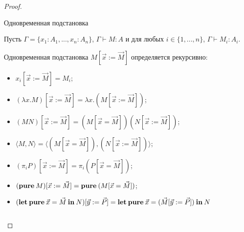 \begin{proof}
\begin{defin}
\begin{itemize}
\begin{small}
  \begin{prooftree}
  \end{prooftree}
\end{small}
\end{itemize}
\end{defin}

\begin{defin} Одновременная подстановка

Пусть $\Gamma = \{ x_1 : A_1, ..., x_n : A_n \}$, $\Gamma \vdash M : A$ и для любых $i \in \{ 1,..., n \}$,
$\Gamma \vdash M_i : A_i$.

 Одновременная подстановка $M [ \vec{x} := \vec{M}]$ определяется рекурсивно:

\begin{itemize}
\item $x_i [ \vec{x} := \vec{M}] = M_i $;
\item $(\lambda x. M) [ \vec{x} := \vec{M}] = \lambda x. (M [ \vec{x} := \vec{M}])$;
\item $(M N) [ \vec{x} := \vec{M}] = (M [ \vec{x} = \vec{M}]) (N [ \vec{x} := \vec{M}])$;
\item $\langle M, N \rangle = \langle (M [ \vec{x} = \vec{M}]), (N [ \vec{x} := \vec{M}])\rangle$;
\item $(\pi_i P) [ \vec{x} := \vec{M}] = \pi_i (P [ \vec{x} = \vec{M}])$;
\item $({\bf pure \:} M) [ \vec{x} := \vec{M}] = {\bf pure \:} (M [ \vec{x} = \vec{M}])$;
\item $({\bf let \: pure} \: \vec{x} = \vec{M} {\: \bf in \:} N) [\vec{y} := \vec{P}] =
{\bf let \: pure} \: \vec{x} = (\vec{M} [\vec{y} := \vec{P}]) {\: \bf in \:} N$
\end{itemize}
\end{defin}

\begin{lemma}
$ $


\end{lemma}
\end{proof}
